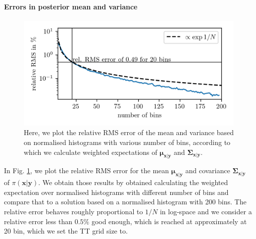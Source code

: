 \paragraph{Errors in posterior mean and variance}
\begin{figure}[ht!]
	\centering
	\includegraphics{relErrO3MeanVar.png}
	\caption[Relative Error of full posterior mean and covariance.]{Here, we plot the relative RMS error of the mean and variance based on normalised histograms with various number of bins, according to which we calculate weighted expectations of $\bm{\mu}_{\bm{x}|\bm{y}}$ and $\bm{\Sigma}_{\bm{x}|\bm{y}}$.}
	\label{fig:MeanVarError}
\end{figure}
In Fig. \ref{fig:MeanVarError}, we plot the relative RMS error for the mean $\bm{\mu}_{\bm{x}|\bm{y}}$ and covariance $\bm{\Sigma}_{\bm{x}|\bm{y}}$ of $\pi(\bm{x}|\bm{y})$.
We obtain those results by obtained calculating the weighted expectation over normalised histograms with different number of bins and compare that to a solution based on a normalised histogram with 200 bins.
The relative error behaves roughly proportional to $1/N$ in log-space and we consider a relative error less than $0.5\%$ good enough, which is reached at approximately at 20 bin, which we set the TT grid size to.
\clearpage
%

